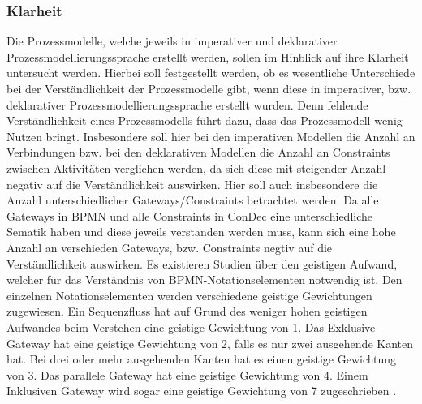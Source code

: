 \subsubsection{Klarheit}
Die Prozessmodelle, welche jeweils in imperativer und deklarativer Prozessmodellierungssprache erstellt werden, sollen im Hinblick auf ihre Klarheit untersucht werden. Hierbei soll festgestellt werden, ob es wesentliche Unterschiede bei der Verständlichkeit der Prozessmodelle gibt, wenn diese in imperativer, bzw. deklarativer Prozessmodellierungssprache erstellt wurden. Denn fehlende Verständlichkeit eines Prozessmodells führt dazu, dass das Prozessmodell wenig Nutzen bringt. Insbesondere soll hier bei den imperativen Modellen die Anzahl an Verbindungen bzw. bei den deklarativen Modellen die Anzahl an Constraints zwischen Aktivitäten verglichen werden, da sich diese mit steigender Anzahl negativ auf die Verständlichkeit auswirken.\newline
Hier soll auch insbesondere die Anzahl unterschiedlicher Gateways/Constraints betrachtet werden.  Da alle Gateways in BPMN und alle Constraints in ConDec eine unterschiedliche Sematik haben und diese jeweils verstanden werden muss, kann sich eine hohe Anzahl an verschieden Gateways, bzw. Constraints negtiv auf die Verständlichkeit auswirken. Es existieren Studien über den geistigen Aufwand, welcher für das Verständnis von BPMN-Notationselementen notwendig ist. Den einzelnen Notationselementen werden verschiedene geistige Gewichtungen zugewiesen. Ein Sequenzfluss hat auf Grund des weniger hohen geistigen Aufwandes beim Verstehen eine geistige Gewichtung von 1. Das Exklusive Gateway hat eine geistige Gewichtung von 2, falls es nur zwei ausgehende Kanten hat. Bei drei oder mehr ausgehenden Kanten hat es einen geistige Gewichtung von 3. Das parallele Gateway hat eine geistige Gewichtung von 4. Einem Inklusiven Gateway wird sogar eine geistige Gewichtung von 7 zugeschrieben \cite{gruhn2006adopting, thesis_maja}.\newline
